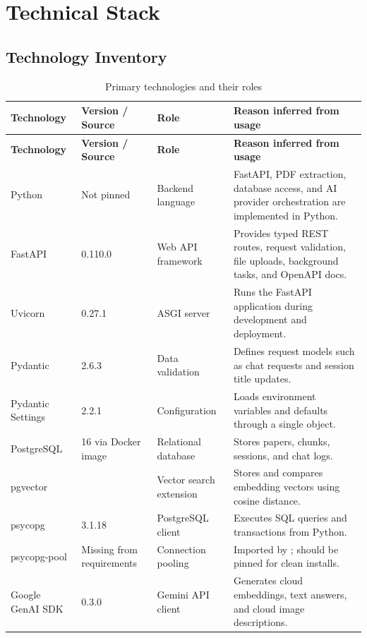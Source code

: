 \documentclass[11pt,a4paper]{report}
\newcommand{\code}[1]{\texttt{\detokenize{#1}}}
\begin{document}
\newpage
\chapter{Technical Stack}

\section{Technology Inventory}

\begin{longtable}{p{} p{} p{} p{}}
\caption{Primary technologies and their roles}
\label{tab:tech-stack}\\
\toprule
\textbf{Technology} & \textbf{Version / Source} & \textbf{Role} & \textbf{Reason inferred from usage} \\
\midrule
\endfirsthead
\toprule
\textbf{Technology} & \textbf{Version / Source} & \textbf{Role} & \textbf{Reason inferred from usage} \\
\midrule
\endhead
Python & Not pinned & Backend language & FastAPI, PDF extraction, database access, and AI provider orchestration are implemented in Python. \\
FastAPI & 0.110.0 & Web API framework & Provides typed REST routes, request validation, file uploads, background tasks, and OpenAPI docs. \\
Uvicorn & 0.27.1 & ASGI server & Runs the FastAPI application during development and deployment. \\
Pydantic & 2.6.3 & Data validation & Defines request models such as chat requests and session title updates. \\
Pydantic Settings & 2.2.1 & Configuration & Loads environment variables and defaults through a single \code{Settings} object. \\
PostgreSQL & 16 via Docker image & Relational database & Stores papers, chunks, sessions, and chat logs. \\
pgvector & \code{pgvector/pgvector:pg16} & Vector search extension & Stores and compares embedding vectors using cosine distance. \\
psycopg & 3.1.18 & PostgreSQL client & Executes SQL queries and transactions from Python. \\
psycopg-pool & Missing from requirements & Connection pooling & Imported by \code{app/db.py}; should be pinned for clean installs. \\
Google GenAI SDK & 0.3.0 & Gemini API client & Generates cloud embeddings, text answers, and cloud image descriptions. \\

\end{longtable}
\end{document}
